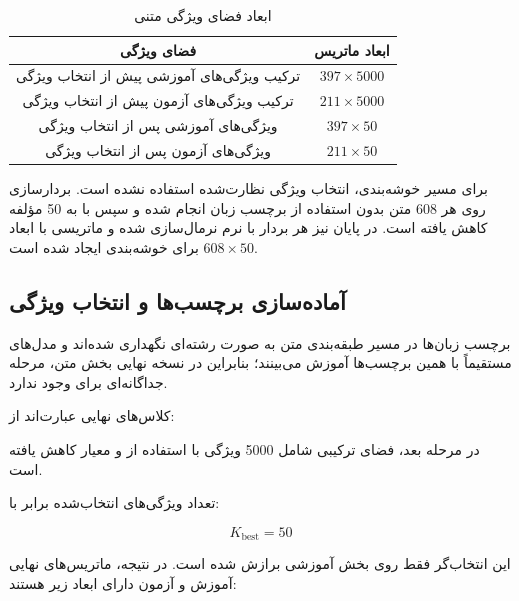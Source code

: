\documentclass[12pt,a4paper,oneside]{report}
\begin{document}
\begin{table}[H]
\centering
\caption{ابعاد فضای ویژگی متنی}
\label{tab:text-feature-shapes}
\begin{tabular}{c c}
\toprule
\textbf{فضای ویژگی} & \textbf{ابعاد ماتریس} \\
\midrule
ترکیب ویژگی‌های آموزشی پیش از انتخاب ویژگی & $397 \times 5000$ \\
ترکیب ویژگی‌های آزمون پیش از انتخاب ویژگی & $211 \times 5000$ \\
ویژگی‌های آموزشی پس از انتخاب ویژگی & $397 \times 50$ \\
ویژگی‌های آزمون پس از انتخاب ویژگی & $211 \times 50$ \\
\bottomrule
\end{tabular}
\end{table}

برای مسیر خوشه‌بندی، انتخاب ویژگی نظارت‌شده
استفاده نشده است. بردارسازی روی هر 608 متن بدون استفاده از برچسب زبان انجام شده و سپس با
به 50 مؤلفه کاهش یافته است. در پایان نیز هر بردار با نرم
نرمال‌سازی شده و ماتریسی با ابعاد
$608\times50$
برای خوشه‌بندی ایجاد شده است.


\subsection{آماده‌سازی برچسب‌ها و انتخاب ویژگی}

برچسب زبان‌ها در مسیر طبقه‌بندی متن به صورت رشته‌ای نگهداری شده‌اند و مدل‌های
مستقیماً با همین برچسب‌ها آموزش می‌بینند؛ بنابراین در نسخه نهایی بخش متن، مرحله جداگانه‌ای برای
وجود ندارد.

کلاس‌های نهایی عبارت‌اند از:

\begin{center}
\end{center}

در مرحله بعد، فضای ترکیبی شامل 5000 ویژگی با استفاده از
و معیار
کاهش یافته است.

تعداد ویژگی‌های انتخاب‌شده برابر با:

\begin{equation}
K_{\mathrm{best}}=50
\end{equation}

این انتخاب‌گر فقط روی بخش آموزشی برازش شده است. در نتیجه، ماتریس‌های نهایی آموزش و آزمون دارای ابعاد زیر هستند:
\end{document}
